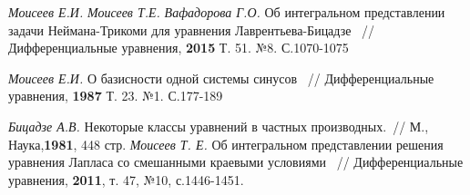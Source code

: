 \documentclass[a4paper, 9pt]{article}
\begin{document}
	\begin{thebibliography}{99} \itemsep=-2pt \vspace{-0.8cm}
		
		
		 \textit{Моисеев Е.И.} \textit{Моисеев Т.Е.} \textit{Вафадорова Г.О.} Об интегральном представлении задачи Неймана-Трикоми для уравнения Лаврентьева-Бицадзе ~// Дифференциальные уравнения, \textbf{2015} Т. 51. №8. С.1070-1075
		
		 \textit{Моисеев Е.И.} О базисности одной системы синусов ~// Дифференциальные уравнения, \textbf{1987} Т. 23. №1. С.177-189
		
		 \textit{Бицадзе А.В.} Некоторые классы уравнений в частных производных.~// М., Наука,\textbf{1981}, 448 стр. 
		 \textit{Моисеев Т. Е.} Об интегральном представлении решения уравнения Лапласа со
		смешанными краевыми условиями ~// Дифференциальные уравнения, \textbf{2011}, т. 47, №10, с.1446-1451. 
	\end{thebibliography}
\end{document}
